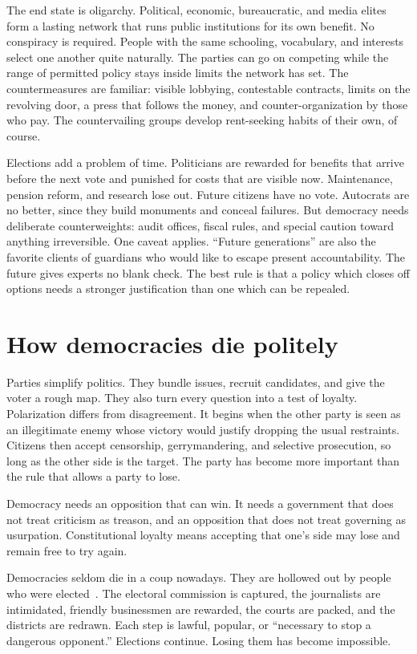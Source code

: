 \documentclass[12pt,a4paper]{book}
\begin{document}
The end state is oligarchy. Political, economic, bureaucratic, and media elites form a lasting network that runs public institutions for its own benefit. No conspiracy is required. People with the same schooling, vocabulary, and interests select one another quite naturally. The parties can go on competing while the range of permitted policy stays inside limits the network has set. The countermeasures are familiar: visible lobbying, contestable contracts, limits on the revolving door, a press that follows the money, and counter-organization by those who pay. The countervailing groups develop rent-seeking habits of their own, of course.

Elections add a problem of time. Politicians are rewarded for benefits that arrive before the next vote and punished for costs that are visible now. Maintenance, pension reform, and research lose out. Future citizens have no vote. Autocrats are no better, since they build monuments and conceal failures. But democracy needs deliberate counterweights: audit offices, fiscal rules, and special caution toward anything irreversible. One caveat applies. ``Future generations'' are also the favorite clients of guardians who would like to escape present accountability. The future gives experts no blank check. The best rule is that a policy which closes off options needs a stronger justification than one which can be repealed.

\section{How democracies die politely}

Parties simplify politics. They bundle issues, recruit candidates, and give the voter a rough map. They also turn every question into a test of loyalty. Polarization differs from disagreement. It begins when the other party is seen as an illegitimate enemy whose victory would justify dropping the usual restraints. Citizens then accept censorship, gerrymandering, and selective prosecution, so long as the other side is the target. The party has become more important than the rule that allows a party to lose.

Democracy needs an opposition that can win. It needs a government that does not treat criticism as treason, and an opposition that does not treat governing as usurpation. Constitutional loyalty means accepting that one's side may lose and remain free to try again.

Democracies seldom die in a coup nowadays. They are hollowed out by people who were elected~\cite{Diamond2019,HaggardKaufman2021}. The electoral commission is captured, the journalists are intimidated, friendly businessmen are rewarded, the courts are packed, and the districts are redrawn. Each step is lawful, popular, or ``necessary to stop a dangerous opponent.'' Elections continue. Losing them has become impossible.
\end{document}
